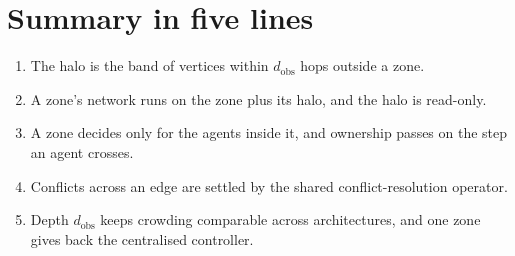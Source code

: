 \documentclass[11pt,a4paper]{article}
\begin{document}
\section{Summary in five lines}

\begin{enumerate}[leftmargin=*]
  \item The halo is the band of vertices within $d_{\mathrm{obs}}$ hops outside a zone.
  \item A zone's network runs on the zone plus its halo, and the halo is read-only.
  \item A zone decides only for the agents inside it, and ownership passes on the step an agent crosses.
  \item Conflicts across an edge are settled by the shared conflict-resolution operator.
  \item Depth $d_{\mathrm{obs}}$ keeps crowding comparable across architectures, and one zone gives back the centralised controller.
\end{enumerate}
\end{document}
